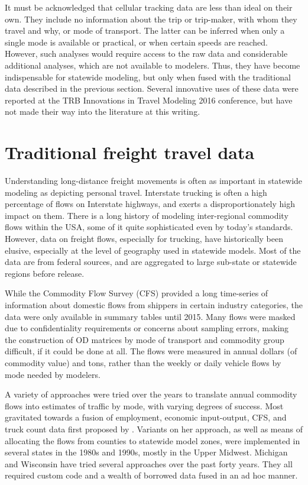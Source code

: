 It must be acknowledged that cellular tracking data are less than ideal on their own. They include no information about the trip or trip-maker, with whom they travel and why, or mode of transport. The latter can be inferred when only a single mode is available or practical, or when certain speeds are reached. However, such analyses would require access to the raw data and considerable additional analyses, which are not available to modelers. Thus, they have become indispensable for statewide modeling, but only when fused with the traditional data described in the previous section. Several innovative uses of these data were reported at the TRB Innovations in Travel Modeling 2016 conference, but have not made their way into the literature at this writing.

\section{Traditional freight travel data}\label{sec:traditional-freight-data}

Understanding long-distance freight movements is often as important in statewide modeling as depicting personal travel. Interstate trucking is often a high percentage of flows on Interstate highways, and exerts a disproportionately high impact on them. There is a long history of modeling inter-regional commodity flows within the USA, some of it quite sophisticated even by today's standards. However, data on freight flows, especially for trucking, have historically been elusive, especially at the level of geography used in statewide models. Most of the data are from federal sources, and are aggregated to large sub-state or statewide regions before release.

While the Commodity Flow Survey (CFS) provided a long time-series of information about domestic flows from shippers in certain industry categories, the data were only available in summary tables until 2015. Many flows were masked due to confidentiality requirements or concerns about sampling errors, making the construction of OD matrices by mode of transport and commodity group difficult, if it could be done at all. The flows were measured in annual dollars (of commodity value) and tons, rather than the weekly or daily vehicle flows by mode needed by modelers.

A variety of approaches were tried over the years to translate annual commodity flows into estimates of traffic by mode, with varying degrees of success. Most gravitated towards a fusion of employment, economic input-output, CFS, and truck count data first proposed by \citep{polenske74, polenske75}. Variants on her approach, as well as means of allocating the flows from counties to statewide model zones, were implemented in several states in the 1980s and 1990s, mostly in the Upper Midwest. Michigan and Wisconsin have tried several approaches over the past forty years. They all required custom code and a wealth of borrowed data fused in an ad hoc manner.


